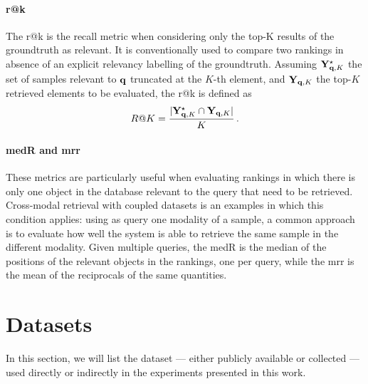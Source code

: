 
\paragraph{\acrlong{r@k}}
The \acrfull{r@k} is the recall metric when considering only the top-K results of the groundtruth as relevant.
It is conventionally used to compare two rankings in absence of an explicit relevancy labelling of the groundtruth.
Assuming $\mathbf{Y}^{\star}_{\mathbf{q}, K}$ the set of samples relevant to $\mathbf{q}$ truncated at the $K$-th element, and $\mathbf{Y}_{\mathbf{q},K}$ the top-$K$ retrieved elements to be evaluated, the \gls{r@k} is defined as
\begin{equation} \label{eq:back:r@k}
    R@K = \frac{|\mathbf{Y}^{\star}_{\mathbf{q}, K} \cap \mathbf{Y}_{\mathbf{q},K}|}{K} \,.
\end{equation}

\paragraph{\acrlong{medR} and \acrlong{mrr}}
These metrics are particularly useful when evaluating rankings in which there is only one object in the database relevant to the query that need to be retrieved.
Cross-modal retrieval with coupled datasets is an examples in which this condition applies: using as query one modality of a sample, a common approach is to evaluate how well the system is able to retrieve the same sample in the different modality.
Given multiple queries, the \acrfull{medR} is the median of the positions of the relevant objects in the rankings, one per query,
while the \acrfull{mrr} is the mean of the reciprocals of the same quantities.



\section{Datasets}
\label{sec:back:datasets}
In this section, we will list the dataset --- either publicly available or collected --- used directly or indirectly in the experiments presented in this work.

